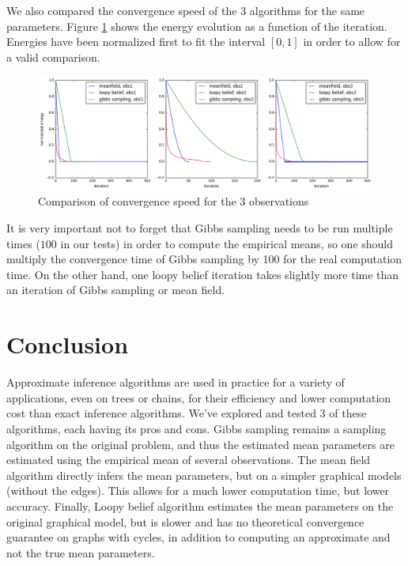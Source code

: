 \documentclass[a4paper]{article}
\begin{document}
    We also compared the convergence speed of the 3 algorithms for the same parameters. Figure \ref{figure:compare2} shows the energy evolution as a function of the iteration. Energies have been normalized first to fit the interval $[0,1]$ in order to allow for a valid comparison.
    
    \begin{figure}[ht]
        \centering
    	\includegraphics[width=0.72\paperwidth]{compare_mf_lb_gibbs_3_3bis}
    	\caption{Comparison of convergence speed for the 3 observations}
    	\label{figure:compare2}
    \end{figure}
    
    It is very important not to forget that Gibbs sampling needs to be run multiple times ($100$ in our tests) in order to compute the empirical means, so one should multiply the convergence time of Gibbs sampling by 100 for the real computation time. On the other hand, one loopy belief iteration takes slightly more time than an iteration of Gibbs sampling or mean field.

\section{Conclusion}
    Approximate inference algorithms are used in practice for a variety of applications, even on trees or chains, for their efficiency and lower computation cost than exact inference algorithms. We've explored and tested 3 of these algorithms, each having its pros and cons. Gibbs sampling remains a sampling algorithm on the original problem, and thus the estimated mean parameters are estimated using the empirical mean of several observations. The mean field algorithm directly infers the mean parameters, but on a simpler graphical models (without the edges). This allows for a much lower computation time, but lower accuracy. Finally, Loopy belief algorithm estimates the mean parameters on the original graphical model, but is slower and has no theoretical convergence guarantee on graphs with cycles, in addition to computing an approximate and not the true mean parameters.
    
    


\end{document}

